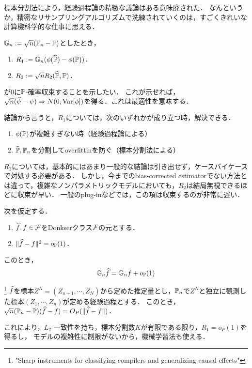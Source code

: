 \documentclass[uplatex,dvipdfmx]{jsreport}
\begin{document}
\begin{tcolorbox}[colframe=ForestGreen, colback=ForestGreen!10!white,breakable,colbacktitle=ForestGreen!40!white,coltitle=black,fonttitle=\bfseries\sffamily,
title=]
    標本分割法により，経験過程論の精緻な議論はある意味廃された．
    なんというか，精密なリサンプリングアルゴリズムで洗練されていくのは，すごくきれいな計算機科学的な仕事に思える．
\end{tcolorbox}

\begin{problem}
    $\mathbb{G}_n:=\sqrt{n}(\mathbb{P}_n-\mathbb{P})$としたとき，
    \begin{enumerate}
        \item $R_1:=\mathbb{G}_n(\phi(\widehat{\mathbb{P}})-\phi(\mathbb{P}))$．
        \item $R_2:=\sqrt{n}R_2(\widehat{\mathbb{P}},\mathbb{P})$．
    \end{enumerate}
    が$0$に$\mathbb{P}$-確率収束することを示したい．
    これが示せれば，$\sqrt{n}(\widehat{\psi}-\psi)\Rightarrow N(0,\mathrm{Var}[\phi])$を得る．これは最適性を意味する．
\end{problem}
\begin{discussion}
    結論から言うと，$R_1$については，次のいずれかが成り立つ時，解決できる．
    \begin{enumerate}
        \item $\phi(\mathbb{P})$が複雑すぎない時（経験過程論による）
        \item $\widehat{\mathbb{P}},\mathbb{P}_n$を分割してoverfittinを防ぐ（標本分割法による）
    \end{enumerate}
    $R_2$については，基本的にはあまり一般的な結論は引き出せず，ケースバイケースで対処する必要がある．
    しかし，今までのbias-corrected estimatorでない方法とは違って，複雑なノンパラメトリックモデルにおいても，$R_2$は結局無視できるほどに収束が早い．
    一般のplug-inなどでは，この項は収束するのが非常に遅い．
\end{discussion}

\begin{lemma}
    次を仮定する．
    \begin{enumerate}[({A}1)]
        \item $\widehat{f},f\in\mathcal{F}$をDonkserクラス$\mathcal{F}$の元とする．
        \item $\|\widehat{f}-f\|^2=o_{\mathbb{P}}(1)$．
    \end{enumerate}
    このとき，
    \[\mathbb{G}_n\widehat{f}=\mathbb{G}_nf+o_{\mathbb{P}}(1)\]
\end{lemma}

\begin{lemma}\footnote{"Sharp instruments for classifying compilers and generalizing causal effects"}
    $\widehat{f}$を標本$Z^N=(Z_{n+1},\cdots,Z_N)$から定めた推定量とし，$\mathbb{P}_n$で$Z^N$と独立に観測した標本$(Z_1,\cdots,Z_n)$が定める経験過程とする．
    このとき，$\sqrt{n}(\mathbb{P}_n-\mathbb{P})(\widehat{f}-f)=O_P(\|\widehat{f}-f\|)$．
\end{lemma}
\begin{remarks}
    これにより，$L_2$-一致性を持ち，標本分割数$K$が有限である限り，$R_1=o_P(1)$を得るし，
    モデルの複雑性に制限がないから，機械学習法も使える．

\end{remarks}
\end{document}
